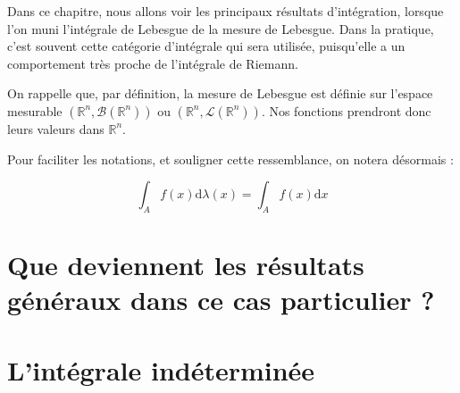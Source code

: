 \documentclass[../integ-proba.tex]{subfiles}
\begin{document}
Dans ce chapitre, nous allons voir les principaux résultats d'intégration, lorsque l'on muni l'intégrale de Lebesgue de la mesure de Lebesgue.
Dans la pratique, c'est souvent cette catégorie d'intégrale qui sera utilisée, puisqu'elle a un comportement très proche de l'intégrale de Riemann.

On rappelle que, par définition, la mesure de Lebesgue est définie sur l'espace mesurable $\left(\mathbb{R}^n, \mathcal{B}(\mathbb{R}^n)\right)$ ou $\left(\mathbb{R}^n, \mathcal{L}(\mathbb{R}^n)\right)$.
Nos fonctions prendront donc leurs valeurs dans $\mathbb{R}^n$.

Pour faciliter les notations, et souligner cette ressemblance, on notera désormais :

$$
\int_Af(x)\text{d}\lambda(x) = \int_Af(x)\text{d}x
$$

\section{Que deviennent les résultats généraux dans ce cas particulier ?}

\section{L'intégrale indéterminée}



\end{document}
